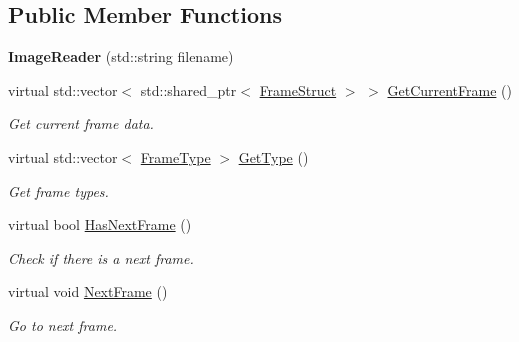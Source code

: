 \subsection*{Public Member Functions}
\begin{DoxyCompactItemize}
\item 
\mbox{\label{classmoetsi_1_1ssp_1_1ImageReader_a8b64ab50c05bcf2179a7921fdb9baa29}} 
{\bfseries Image\+Reader} (std\+::string filename)
\item 
\mbox{\label{classmoetsi_1_1ssp_1_1ImageReader_aacdb29f83bf5e38231ef26d89338c3b1}} 
virtual std\+::vector$<$ std\+::shared\+\_\+ptr$<$ \hyperlink{structmoetsi_1_1ssp_1_1FrameStruct}{Frame\+Struct} $>$ $>$ \hyperlink{classmoetsi_1_1ssp_1_1ImageReader_aacdb29f83bf5e38231ef26d89338c3b1}{Get\+Current\+Frame} ()
\begin{DoxyCompactList}\small\item\em Get current frame data. \end{DoxyCompactList}\item 
virtual std\+::vector$<$ \hyperlink{namespacemoetsi_1_1ssp_a46efdfa2cd5a28ead465dcc8006b5a87}{Frame\+Type} $>$ \hyperlink{classmoetsi_1_1ssp_1_1ImageReader_af6f66957b6e3268c5336f4176c77fc73}{Get\+Type} ()
\begin{DoxyCompactList}\small\item\em Get frame types. \end{DoxyCompactList}\item 
virtual bool \hyperlink{classmoetsi_1_1ssp_1_1ImageReader_ad8e87720ca0ec97de501f1070119b28d}{Has\+Next\+Frame} ()
\begin{DoxyCompactList}\small\item\em Check if there is a next frame. \end{DoxyCompactList}\item 
\mbox{\label{classmoetsi_1_1ssp_1_1ImageReader_a9b0a43f9a4fff4d0b8448e8ba168ad05}} 
virtual void \hyperlink{classmoetsi_1_1ssp_1_1ImageReader_a9b0a43f9a4fff4d0b8448e8ba168ad05}{Next\+Frame} ()
\begin{DoxyCompactList}\small\item\em Go to next frame. \end{DoxyCompactList}\item 
\mbox{\label{classmoetsi_1_1ssp_1_1ImageReader_ae9ffc89ceed365c96b8d50e46ee8dc20}} 

\end{DoxyCompactItemize}
